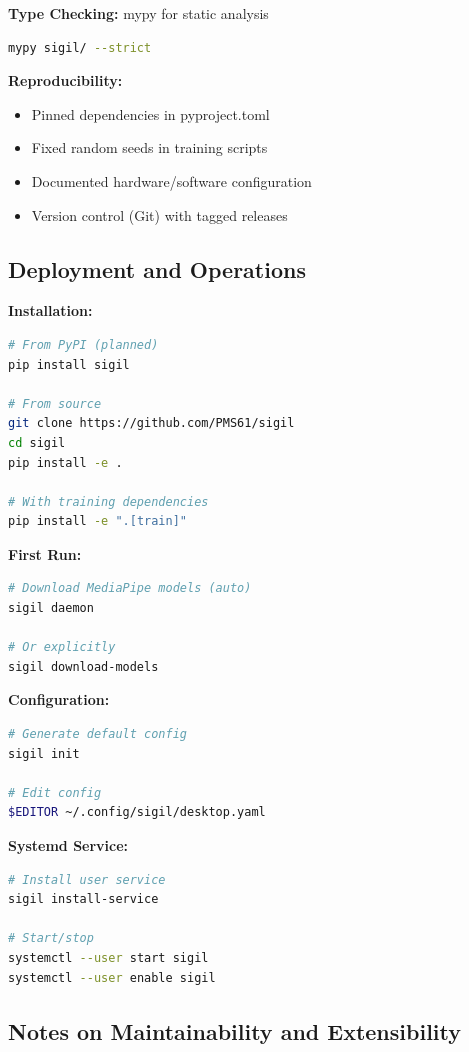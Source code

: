 \documentclass[11pt,a4paper]{article}
\begin{document}
\textbf{Type Checking:} mypy for static analysis
\begin{lstlisting}[language=bash]
mypy sigil/ --strict
\end{lstlisting}

\textbf{Reproducibility:}
\begin{itemize}
\item Pinned dependencies in pyproject.toml
\item Fixed random seeds in training scripts
\item Documented hardware/software configuration
\item Version control (Git) with tagged releases
\end{itemize}

\subsection{Deployment and Operations}

\textbf{Installation:}
\begin{lstlisting}[language=bash]
# From PyPI (planned)
pip install sigil

# From source
git clone https://github.com/PMS61/sigil
cd sigil
pip install -e .

# With training dependencies
pip install -e ".[train]"
\end{lstlisting}

\textbf{First Run:}
\begin{lstlisting}[language=bash]
# Download MediaPipe models (auto)
sigil daemon

# Or explicitly
sigil download-models
\end{lstlisting}

\textbf{Configuration:}
\begin{lstlisting}[language=bash]
# Generate default config
sigil init

# Edit config
$EDITOR ~/.config/sigil/desktop.yaml
\end{lstlisting}

\textbf{Systemd Service:}
\begin{lstlisting}[language=bash]
# Install user service
sigil install-service

# Start/stop
systemctl --user start sigil
systemctl --user enable sigil
\end{lstlisting}

\subsection{Notes on Maintainability and Extensibility}
\end{document}

